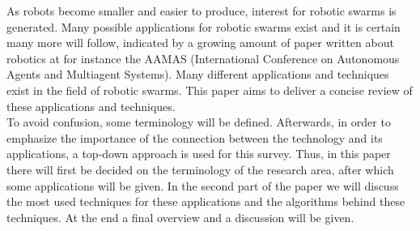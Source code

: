 As robots become smaller and easier to produce, interest for robotic swarms is generated. Many possible applications for robotic swarms exist and it is certain many more will follow, indicated by a growing amount of paper written about robotics at for instance the AAMAS (International Conference on Autonomous Agents and Multiagent Systems). \cite{Amigoni2014} Many different applications and techniques exist in the field of robotic swarms. This paper aims to deliver a concise review of these applications and techniques. \\

To avoid confusion, some terminology will be defined. Afterwards, in order to emphasize the importance of the connection between the technology and its applications, a top-down approach is used for this survey. Thus, in this paper there will first be decided on the terminology of the research area, after which some applications will be given.  In the second part of the paper we will discuss the most used techniques for these applications and the algorithms behind these techniques. At the end a final overview and a discussion will be given.\\